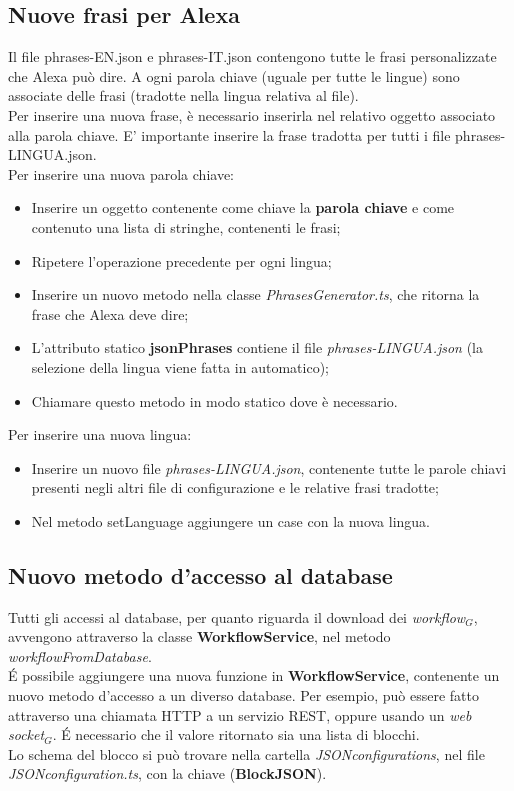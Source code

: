 \subsection{Nuove frasi per Alexa}\label{newFrasi}
Il file phrases-EN.json e phrases-IT.json contengono tutte le frasi personalizzate che Alexa può dire. A ogni parola chiave (uguale per tutte le lingue) sono associate delle frasi (tradotte nella lingua relativa al file).\\
Per inserire una nuova frase, è necessario inserirla nel relativo oggetto associato alla parola chiave. E' importante inserire la frase tradotta per tutti i file phrases-LINGUA.json.\\
Per inserire una nuova parola chiave:
\begin{itemize}
	\item Inserire un oggetto contenente come chiave la \textbf{parola chiave} e come contenuto una lista di stringhe, contenenti le frasi;
	\item Ripetere l'operazione precedente per ogni lingua;
	\item Inserire un nuovo metodo nella classe \textit{PhrasesGenerator.ts}, che ritorna la frase che Alexa deve dire;
	\item L'attributo statico \textbf{jsonPhrases} contiene il file \textit{phrases-LINGUA.json} (la selezione della lingua viene fatta in automatico);
	\item Chiamare questo metodo in modo statico dove è necessario.
\end{itemize}
Per inserire una nuova lingua:
\begin{itemize}
	\item Inserire un nuovo file \textit{phrases-LINGUA.json}, contenente tutte le parole chiavi presenti negli altri file di configurazione e le relative frasi tradotte;
	\item Nel metodo setLanguage aggiungere un case con la nuova lingua.
\end{itemize} 
\subsection{Nuovo metodo d'accesso al database} \label{newAccesso}
Tutti gli accessi al database, per quanto riguarda il download dei \textit{workflow$_{G}$}, avvengono attraverso la classe \textbf{WorkflowService}, nel metodo \textit{workflowFromDatabase}.\\
\'{E} possibile aggiungere una nuova funzione in \textbf{WorkflowService}, contenente un nuovo metodo d'accesso a un diverso database. Per esempio, può essere fatto attraverso una chiamata HTTP a un servizio REST, oppure usando un \textit{web socket$_{G}$}. \'{E} necessario che il valore ritornato sia una lista di blocchi.\\
Lo schema del blocco si può trovare nella cartella \textit{JSONconfigurations}, nel file \textit{JSONconfiguration.ts}, con la chiave (\textbf{BlockJSON}).

